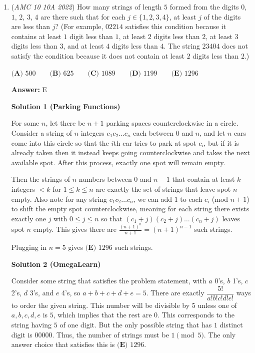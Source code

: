\begin{enumerate}
 Notice that in the fraction we want, both the numerator and denominator's conjugates are equal because of our equation. By multiplying that fraction by $\frac{\sqrt{9-h_2^2}-\sqrt{4-h_2^2}}{\sqrt{16-h_1^2}-\sqrt{1-h_1^2}}$, all $h_1$ and $h_2$ cancel, leaving us with $\frac{1}{3}$.

 


	\item (\textit{AMC 10 10A 2022}) How many strings of length $5$ formed from the digits $0$, $1$, $2$, $3$, $4$ are there such that for each $j \in \{1,2,3,4\}$, at least $j$ of the digits are less than $j$? (For example, $02214$ satisfies this condition
because it contains at least $1$ digit less than $1$, at least $2$ digits less than $2$, at least $3$ digits less
than $3$, and at least $4$ digits less than $4$. The string $23404$ does not satisfy the condition because it
does not contain at least $2$ digits less than $2$.)


 $\textbf{(A) }500\qquad\textbf{(B) }625\qquad\textbf{(C) }1089\qquad\textbf{(D) }1199\qquad\textbf{(E) }1296$

 \textbf{Answer: }E



\textbf{Solution 1 (Parking Functions)}

For some $n$, let there be $n+1$ parking spaces counterclockwise in a circle. Consider a string of $n$ integers $c_1c_2 \ldots c_n$ each between $0$ and $n$, and let $n$ cars come into this circle so that the $i$th car tries to park at spot $c_i$, but if it is already taken then it instead keeps going counterclockwise and takes the next available spot. After this process, exactly one spot will remain empty.

 Then the strings of $n$ numbers between $0$ and $n-1$ that contain at least $k$ integers $<k$ for $1 \leq k \leq n$ are exactly the set of strings that leave spot $n$ empty. Also note for any string $c_1c_2 \ldots c_n$, we can add $1$ to each $c_i$ (mod $n+1$) to shift the empty spot counterclockwise, meaning for each string there exists exactly one $j$ with $0 \leq j \leq n$ so that $(c_1+j)(c_2+j) \ldots (c_n+j)$ leaves spot $n$ empty. This gives there are $\frac{(n+1)^{n}}{n+1} = (n+1)^{n-1}$ such strings. 

 Plugging in $n = 5$ gives $\boxed{\textbf{(E) }1296}$ such strings.

 



\textbf{Solution 2 (OmegaLearn)}

Consider some string that satisfies the problem statement, with $a$ 0's, $b$ 1's, $c$ 2's, $d$ 3's, and $e$ 4's, so $a+b+c+d+e=5$. There are exactly $\dfrac{5!}{a!b!c!d!e!}$ ways to order the given string. This number will be divisible by 5 unless one of $a, b, c, d, e$ is $5$, which implies that the rest are $0$. This corresponds to the string having $5$ of one digit. But the only possible string that has $1$ distinct digit is $00000$. Thus, the number of strings must be $1 \pmod{5}$. The only answer choice that satisfies this is $\boxed{\textbf{(E) }1296}$.


\end{enumerate}
